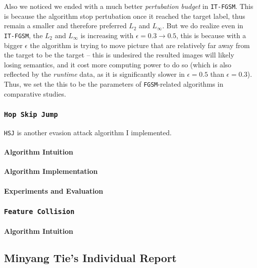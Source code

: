 \documentclass[11pt]{article}
\newcommand{\ilc}{\texttt}
\begin{document}
	Also we noticed we ended with a much better \textit{pertubation budget} in \ilc{IT-FGSM}. This is because the algorithm stop pertubation once it reached the target label, thus remain a smaller and therefore preferred $L_2$ and $L_\infty$. But we do realize even in \ilc{IT-FGSM}, the $L_2$ and $L_\infty$ is increasing with $\epsilon = 0.3 \rightarrow 0.5$, this is because with a bigger $\epsilon$ the algorithm is trying to move picture that are relatively far away from the target to be the target -- this is undesired the resulted images will likely losing semantics, and it cost more computing power to do so (which is also reflected by the \textit{runtime} data, as it is significantly slower in $\epsilon = 0.5$ than $\epsilon = 0.3$). Thus, we set the this to be the parameters of \ilc{FGSM}-related algorithms in comparative studies.
	
	
	
	\subsubsection{\ilc{Hop Skip Jump}}
	
	\ilc{HSJ}\cite{cite:hsj_paper} is another evasion attack algorithm I implemented.
	
	\paragraph{Algorithm Intuition}
	\paragraph{Algorithm Implementation}
	\paragraph{Experiments and Evaluation}
	
	
	\subsubsection{\ilc{Feature Collision}}
	\paragraph{Algorithm Intuition}
	
	
	\subsection{Minyang Tie's Individual Report}
	
\end{document}
